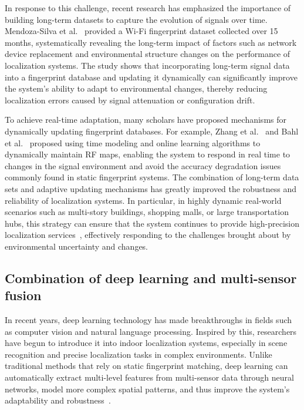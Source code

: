 \documentclass[12pt,a4paper]{article}
\numberwithin{equation}{section}
\begin{document}
In response to this challenge, recent research has emphasized the importance of
building long-term datasets to capture the evolution of signals over
time. Mendoza-Silva et al.~\cite{data3010003} provided a Wi-Fi fingerprint
dataset collected over 15 months, systematically revealing the long-term impact
of factors such as network device replacement and environmental structure
changes on the performance of localization systems. The study shows that
incorporating long-term signal data into a fingerprint database and updating it
dynamically can significantly improve the system's ability to adapt to
environmental changes, thereby reducing localization errors caused by signal
attenuation or configuration drift.

To achieve real-time adaptation, many scholars have proposed mechanisms for
dynamically updating fingerprint databases. For example, Zhang et
al.~\cite{zhang2019dynamic} and Bahl et al.~\cite{10.1145/2568225.2568272}
proposed using time modeling and online learning algorithms to dynamically
maintain RF maps, enabling the system to respond in real time to changes in the
signal environment and avoid the accuracy degradation issues commonly found in
static fingerprint systems.  The combination of long-term data sets and adaptive
updating mechanisms has greatly improved the robustness and reliability of
localization systems. In particular, in highly dynamic real-world scenarios such
as multi-story buildings, shopping malls, or large transportation hubs, this
strategy can ensure that the system continues to provide high-precision
localization services~\cite{sen2013you, shang2015enhancing}, effectively
responding to the challenges brought about by environmental uncertainty and
changes.

\subsection{Combination of deep learning and multi-sensor fusion}
In recent years, deep learning technology has made breakthroughs in fields such
as computer vision and natural language processing. Inspired by this,
researchers have begun to introduce it into indoor localization systems,
especially in scene recognition and precise localization tasks in complex
environments. Unlike traditional methods that rely on static fingerprint
matching, deep learning can automatically extract multi-level features from
multi-sensor data through neural networks, model more complex spatial patterns,
and thus improve the system's adaptability and robustness~\cite{s151229867,
  nowicki2017ml}.
\end{document}
